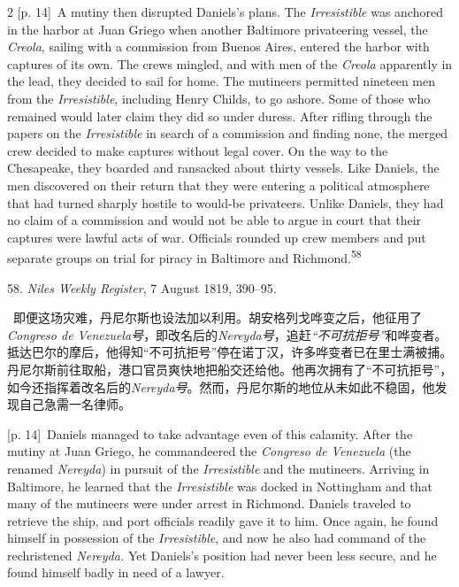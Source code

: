 \documentclass[10pt,a4paper]{article}
\begin{document}
\begin{paracol}{2}
{\scriptsize\color{gray} [p. 14]}\ A mutiny then disrupted Daniels’s plans. The \textit{Irresistible} was anchored in the harbor at Juan Griego when another Baltimore privateering vessel, the \textit{Creola}, sailing with a commission from Buenos Aires, entered the harbor with captures of its own. The crews mingled, and with men of the \textit{Creola} apparently in the lead, they decided to sail for home. The mutineers permitted nineteen men from the \textit{Irresistible}, including Henry Childs, to go ashore. Some of those who remained would later claim they did so under duress. After rifling through the papers on the \textit{Irresistible} in search of a commission and finding none, the merged crew decided to make captures without legal cover. On the way to the Chesapeake, they boarded and ransacked about thirty vessels. Like Daniels, the men discovered on their return that they were entering a political atmosphere that had turned sharply hostile to would-be privateers. Unlike Daniels, they had no claim of a commission and would not be able to argue in court that their captures were lawful acts of war. Officials rounded up crew members and put separate groups on trial for piracy in Baltimore and Richmond.\nobreak\textsuperscript{58}\par{\small 58. \textit{Niles Weekly Register}, 7 August 1819, 390–95.\par}
\switchcolumn*
{\scriptsize\color{gray} [p. 14]}\ 即便这场灾难，丹尼尔斯也设法加以利用。胡安格列戈哗变之后，他征用了\textit{Congreso de Venezuela号}，即改名后的\textit{Nereyda号}，追赶\textit{“不可抗拒号”}和哗变者。抵达巴尔的摩后，他得知“不可抗拒号”停在诺丁汉，许多哗变者已在里士满被捕。丹尼尔斯前往取船，港口官员爽快地把船交还给他。他再次拥有了“不可抗拒号”，如今还指挥着改名后的\textit{Nereyda号}。然而，丹尼尔斯的地位从未如此不稳固，他发现自己急需一名律师。\par
\switchcolumn
{\scriptsize\color{gray} [p. 14]}\ Daniels managed to take advantage even of this calamity. After the mutiny at Juan Griego, he commandeered the \textit{Congreso de Venezuela} (the renamed \textit{Nereyda}) in pursuit of the \textit{Irresistible} and the mutineers. Arriving in Baltimore, he learned that the \textit{Irresistible} was docked in Nottingham and that many of the mutineers were under arrest in Richmond. Daniels traveled to retrieve the ship, and port officials readily gave it to him. Once again, he found himself in possession of the \textit{Irresistible}, and now he also had command of the rechristened \textit{Nereyda.} Yet Daniels’s position had never been less secure, and he found himself badly in need of a lawyer.\par

\end{paracol}
\end{document}
